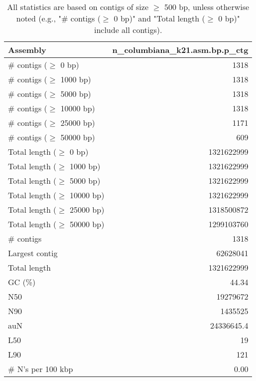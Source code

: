 \documentclass[12pt,a4paper]{article}
\begin{document}
\begin{table}[ht]
\begin{center}
\caption{All statistics are based on contigs of size $\geq$ 500 bp, unless otherwise noted (e.g., "\# contigs ($\geq$ 0 bp)" and "Total length ($\geq$ 0 bp)" include all contigs).}
\begin{tabular}{|l*{1}{|r}|}
\hline
Assembly & n\_columbiana\_k21.asm.bp.p\_ctg \\ \hline
\# contigs ($\geq$ 0 bp) & 1318 \\ \hline
\# contigs ($\geq$ 1000 bp) & 1318 \\ \hline
\# contigs ($\geq$ 5000 bp) & 1318 \\ \hline
\# contigs ($\geq$ 10000 bp) & 1318 \\ \hline
\# contigs ($\geq$ 25000 bp) & 1171 \\ \hline
\# contigs ($\geq$ 50000 bp) & 609 \\ \hline
Total length ($\geq$ 0 bp) & 1321622999 \\ \hline
Total length ($\geq$ 1000 bp) & 1321622999 \\ \hline
Total length ($\geq$ 5000 bp) & 1321622999 \\ \hline
Total length ($\geq$ 10000 bp) & 1321622999 \\ \hline
Total length ($\geq$ 25000 bp) & 1318500872 \\ \hline
Total length ($\geq$ 50000 bp) & 1299103760 \\ \hline
\# contigs & 1318 \\ \hline
Largest contig & 62628041 \\ \hline
Total length & 1321622999 \\ \hline
GC (\%) & 44.34 \\ \hline
N50 & 19279672 \\ \hline
N90 & 1435525 \\ \hline
auN & 24336645.4 \\ \hline
L50 & 19 \\ \hline
L90 & 121 \\ \hline
\# N's per 100 kbp & 0.00 \\ \hline
\end{tabular}
\end{center}
\end{table}
\end{document}
